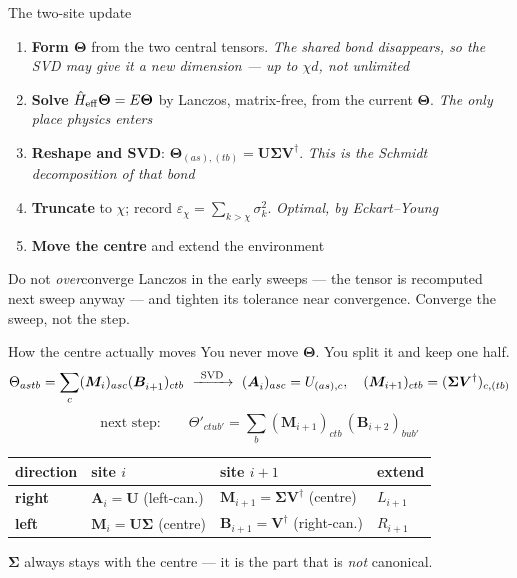 \documentclass[aspectratio=169,10pt]{beamer}
\newcommand{\bmat}[1]{\bm{#1}}
\newcommand{\Amat}[1]{\bm{A}^{#1}}
\newcommand{\Bmat}[1]{\bm{B}^{#1}}
\newcommand{\hH}{\hat{H}}
\begin{document}
\begin{frame}{The two-site update}
  \begin{enumerate}
    \item \textbf{Form $\bm\Theta$} from the two central tensors. \emph{The shared bond disappears, so the SVD may give it a new dimension --- up to $\chi d$, not unlimited}
    \item \textbf{Solve} $\hH_{\rm eff}\bm\Theta=E\bm\Theta$ by Lanczos, matrix-free, from the current $\bm\Theta$. \emph{The only place physics enters}
    \item \textbf{Reshape and SVD}: $\bm\Theta_{(as),(tb)}=\bmat U\bm\Sigma\bmat V^\dagger$. \emph{This \alert{is} the Schmidt decomposition of that bond}
    \item \textbf{Truncate} to $\chi$; record $\varepsilon_\chi=\sum_{k>\chi}\sigma_k^2$. \emph{Optimal, by Eckart--Young}
    \item \textbf{Move the centre} and extend the environment
  \end{enumerate}
  \vspace{0.3em}
  \centering Do not \emph{over}converge Lanczos in the early sweeps --- the tensor is recomputed next sweep anyway ---
  and tighten its tolerance near convergence. Converge the \alert{sweep}, not the step.
\end{frame}

\begin{frame}{How the centre actually moves}
  \centering You never move $\bm\Theta$. You \alert{split} it and keep one half.
  \[
    \Theta_{astb}=\sum_c(\bmat M_i)_{asc}(\Bmat{}_{i+1})_{ctb}
    \ \xrightarrow{\ \rm SVD\ }\
    (\Amat{}_i)_{asc}=U_{(as),c},\quad
    (\bmat M_{i+1})_{ctb}=(\bm\Sigma\bmat V^\dagger)_{c,(tb)}
  \]
  \[
    \text{next step:}\qquad
    \Theta'_{ctub'}=\sum_b(\bmat M_{i+1})_{ctb}\,(\Bmat{}_{i+2})_{bub'}
  \]
  \begin{center}\small
  \begin{tabular}{@{}llll@{}}\toprule
  direction & site $i$ & site $i+1$ & extend\\\midrule
  \textbf{right} & $\Amat{}_i=\bmat U$ (left-can.) & $\bmat M_{i+1}=\bm\Sigma\bmat V^\dagger$ (centre) & $L_{i+1}$\\
  \textbf{left} & $\bmat M_i=\bmat U\bm\Sigma$ (centre) & $\Bmat{}_{i+1}=\bmat V^\dagger$ (right-can.) & $R_{i+1}$\\\bottomrule
  \end{tabular}
  \end{center}
  \centering\small $\bm\Sigma$ always stays with the centre --- it is the part that is \emph{not} canonical.
\end{frame}
\end{document}
